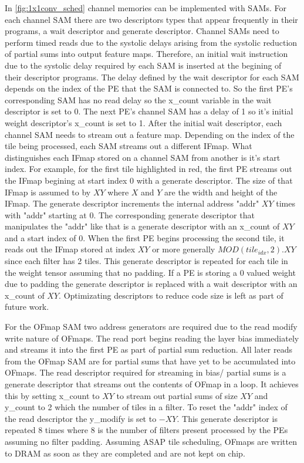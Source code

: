 In \autoref{fig:1x1conv_sched} channel memories can be implemented with SAMs.
For each channel SAM there are two descriptors types that appear frequently in
their programs, a wait descriptor and generate descriptor. Channel SAMs need to
perform timed reads due to the systolic delays arising from the systolic
reduction of partial sums into output feature maps. Therefore, an initial wait
instruction due to the systolic delay required by each SAM is inserted at the
begining of their descriptor programs. The delay defined by the wait descriptor
for each SAM depends on the index of the PE that the SAM is connected to. So the
first PE's corresponding SAM has no read delay so the x\_count variable in the
wait descriptor is set to 0. The next PE's channel SAM has a delay of 1 so it's
initial weight descriptor's x\_count is set to 1. After the initial wait
descriptor, each channel SAM needs to stream out a feature map. Depending on the
index of the tile being processed, each SAM streams out a different IFmap. What
distinguishes each IFmap stored on a channel SAM from another is it's start
index. For example, for the first tile highlighted in red, the first PE streams
out the IFmap begining at start index 0 with a generate descriptor. The size of
that IFmap is assumed to by $XY$ where $X$ and $Y$ are the width and height of
the IFmap. The generate descriptor increments the internal address "addr" $XY$
times with "addr" starting at 0. The corresponding generate descriptor that
manipulates the "addr" like that is a generate descriptor with an x\_count of
$XY$ and a start index of 0. When the first PE begins processing the second
tile, it reads out the IFmap stored at index $XY$ or more generally
$MOD(tile_{idx},2).XY$ since each filter has 2 tiles. This generate descriptor
is repeated for each tile in the weight tensor assuming that no padding. If a PE
is storing a 0 valued weight due to padding the generate descriptor is replaced
with a wait descriptor with an x\_count of $XY$. Optimizating descriptors to
reduce code size is left as part of future work.

For the OFmap SAM two address generators are required due to the read modify
write nature of OFmaps. The read port begins reading the layer bias immediately
and streams it into the first PE as part of partial sum reduction. All later
reads from the OFmap SAM are for partial sums that have yet to be accumulated
into OFmaps. The read descriptor required for streaming in bias/ partial sums is
a generate descriptor that streams out the contents of OFmap in a loop. It
achieves this by setting x\_count to $XY$ to stream out partial sums of size
$XY$ and y\_count to 2 which the number of tiles in a filter. To reset the
"addr" index of the read descriptor the y\_modify is set to $-XY$. This generate
descriptor is repeated 8 times where 8 is the number of filters present
processed by the PEs assuming no filter padding. Assuming ASAP tile scheduling,
OFmaps are written to DRAM as soon as they are completed and are not kept on
chip.

